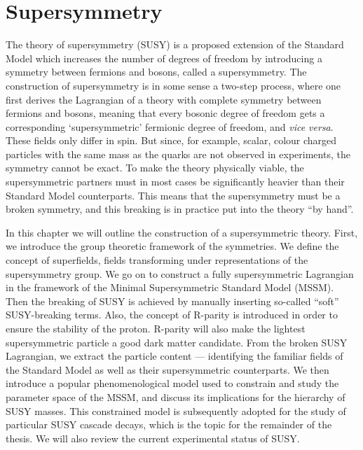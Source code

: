 \documentclass[twoside,english]{uiofysmaster}
\begin{document}
\chapter{Supersymmetry}%
\label{ch:susyintro}
The theory of supersymmetry (SUSY) is a proposed extension of the Standard Model which increases the number of degrees of freedom by introducing a symmetry between fermions and bosons, called a supersymmetry. The construction of supersymmetry is in some sense a two-step process, where one first derives the Lagrangian of a theory with complete symmetry between fermions and bosons, meaning that every bosonic degree of freedom gets a corresponding `supersymmetric' fermionic degree of freedom, and {\it vice versa}. These fields only differ in spin. But since, for example, scalar, colour charged particles with the same mass as the quarks are not observed in experiments, the symmetry cannot be exact. To make the theory physically viable, the supersymmetric partners must in most cases be significantly heavier than their Standard Model counterparts. This means that the supersymmetry must be a broken symmetry, and this breaking is in practice put into the theory ``by hand''.

In this chapter we will outline the construction of a supersymmetric theory. First, we introduce the group theoretic framework of the symmetries. We define the concept of superfields, fields transforming under representations of the supersymmetry group. We go on to construct a fully supersymmetric Lagrangian in the framework of the Minimal Supersymmetric Standard Model (MSSM). Then the breaking of SUSY is achieved by manually inserting so-called ``soft'' SUSY-breaking terms. Also, the concept of R-parity is introduced in order to ensure the stability of the proton. R-parity will also make the lightest supersymmetric particle a good dark matter candidate. From the broken SUSY Lagrangian, we extract the particle content --- identifying the familiar fields of the Standard Model as well as their supersymmetric counterparts. We then introduce a popular phenomenological model used to constrain and study the parameter space of the MSSM, and discuss its implications for the hierarchy of SUSY masses. This constrained model is subsequently adopted for the study of particular SUSY cascade decays, which is the topic for the remainder of the thesis. We will also review the current experimental status of SUSY. 
\end{document}

